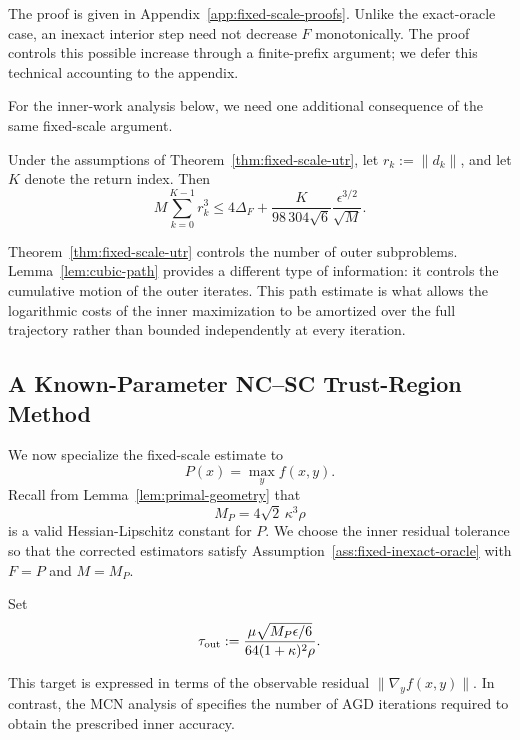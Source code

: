 The proof is given in Appendix~\ref{app:fixed-scale-proofs}.
Unlike the exact-oracle case, an inexact interior step need not
decrease $F$ monotonically. The proof controls this possible increase
through a finite-prefix argument; we defer this technical accounting
to the appendix.

For the inner-work analysis below, we need one additional consequence
of the same fixed-scale argument.

\begin{lemma}
\label{lem:cubic-path}
Under the assumptions of Theorem~\ref{thm:fixed-scale-utr}, let
$r_k:=\|d_k\|$, and let $K$ denote the return index. Then
\begin{equation}
    M\sum_{k=0}^{K-1}r_k^3
    \le
    4\Delta_F
    +
    \frac{K}{98\,304\sqrt6}
    \frac{\epsilon^{3/2}}{\sqrt M}.
    \label{eq:cubic-path}
\end{equation}
\end{lemma}

Theorem~\ref{thm:fixed-scale-utr} controls the number of outer
subproblems. Lemma~\ref{lem:cubic-path} provides a different type of
information: it controls the cumulative motion of the outer iterates.
This path estimate is what allows the logarithmic costs of the inner
maximization to be amortized over the full trajectory rather than
bounded independently at every iteration.


\subsection{A Known-Parameter NC--SC Trust-Region Method}
\label{sec:known-parameter-method}

We now specialize the fixed-scale estimate to
\[
    P(x)=\max_y f(x,y).
\]
Recall from Lemma~\ref{lem:primal-geometry} that
\[
    M_P=4\sqrt2\,\kappa^3\rho
\]
is a valid Hessian-Lipschitz constant for $P$.
We choose the inner residual tolerance so that the corrected
estimators satisfy Assumption~\ref{ass:fixed-inexact-oracle} with
$F=P$ and $M=M_P$.

Set
\begin{equation}
    \tau_{\rm out}
    :=
    \frac{
        \mu\sqrt{M_P\epsilon/6}
    }{
        64(1+\kappa)^2\rho
    }.
    \label{eq:outer-residual-target}
\end{equation}

This target is expressed in terms of the observable residual
$\|\nabla_yf(x,y)\|$. In contrast, the MCN analysis of
\citet{luo2022finding} specifies the number of AGD iterations required
to obtain the prescribed inner accuracy.

